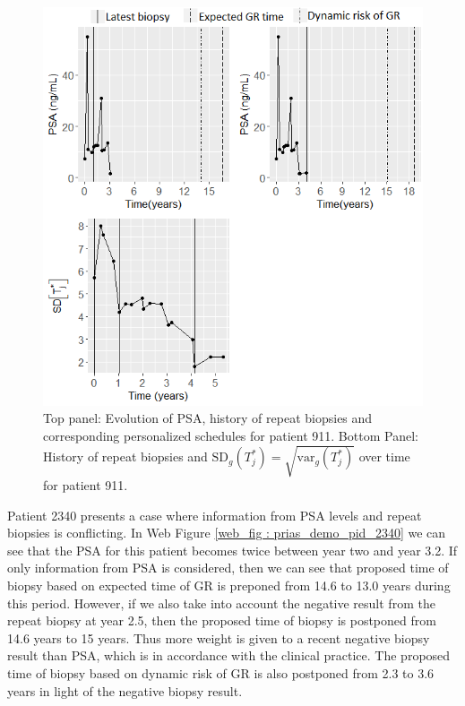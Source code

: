 \begin{figure}
\centerline{
\includegraphics[width=\columnwidth]{images/prias_demo/case_911.png}
}
\caption{Top panel: Evolution of PSA, history of repeat biopsies and corresponding personalized schedules for patient 911. Bottom Panel: History of repeat biopsies and $\mbox{SD}_g(T^*_j) = \sqrt{\mbox{var}_g(T^*_j)}$ over time for patient 911.}
\label{web_fig : prias_demo_pid_911}
\end{figure}

Patient 2340 presents a case where information from PSA levels and repeat biopsies is conflicting. In Web Figure \ref{web_fig : prias_demo_pid_2340} we can see that the PSA for this patient becomes twice between year two and year 3.2. If only information from PSA is considered, then we can see that proposed time of biopsy based on expected time of GR is preponed from 14.6 to 13.0 years during this period. However, if we also take into account the negative result from the repeat biopsy at year 2.5, then the proposed time of biopsy is postponed from 14.6 years to 15 years. Thus more weight is given to a recent negative biopsy result than PSA, which is in accordance with the clinical practice. The proposed time of biopsy based on dynamic risk of GR is also postponed from 2.3 to 3.6 years in light of the negative biopsy result.

